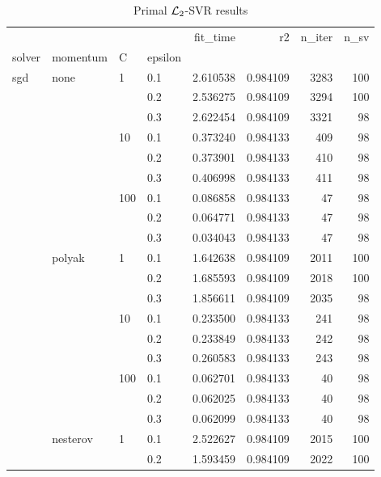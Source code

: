 \begin{table}[H]
\centering
\caption{Primal $\protect \mathcal{L}_2$-SVR results}
\label{primal_l2_svr_cv_results}
\begin{tabular}{llllrrrr}
\toprule
          &   &     &     &  fit\_time &        r2 &  n\_iter &  n\_sv \\
solver & momentum & C & epsilon &           &           &         &       \\
\midrule
sgd & none & 1   & 0.1 &  2.610538 &  0.984109 &    3283 &   100 \\
          &   &     & 0.2 &  2.536275 &  0.984109 &    3294 &   100 \\
          &   &     & 0.3 &  2.622454 &  0.984109 &    3321 &    98 \\
          &   & 10  & 0.1 &  0.373240 &  0.984133 &     409 &    98 \\
          &   &     & 0.2 &  0.373901 &  0.984133 &     410 &    98 \\
          &   &     & 0.3 &  0.406998 &  0.984133 &     411 &    98 \\
          &   & 100 & 0.1 &  0.086858 &  0.984133 &      47 &    98 \\
          &   &     & 0.2 &  0.064771 &  0.984133 &      47 &    98 \\
          &   &     & 0.3 &  0.034043 &  0.984133 &      47 &    98 \\
          & polyak & 1   & 0.1 &  1.642638 &  0.984109 &    2011 &   100 \\
          &   &     & 0.2 &  1.685593 &  0.984109 &    2018 &   100 \\
          &   &     & 0.3 &  1.856611 &  0.984109 &    2035 &    98 \\
          &   & 10  & 0.1 &  0.233500 &  0.984133 &     241 &    98 \\
          &   &     & 0.2 &  0.233849 &  0.984133 &     242 &    98 \\
          &   &     & 0.3 &  0.260583 &  0.984133 &     243 &    98 \\
          &   & 100 & 0.1 &  0.062701 &  0.984133 &      40 &    98 \\
          &   &     & 0.2 &  0.062025 &  0.984133 &      40 &    98 \\
          &   &     & 0.3 &  0.062099 &  0.984133 &      40 &    98 \\
          & nesterov & 1   & 0.1 &  2.522627 &  0.984109 &    2015 &   100 \\
          &   &     & 0.2 &  1.593459 &  0.984109 &    2022 &   100 \\

\end{tabular}
\end{table}
